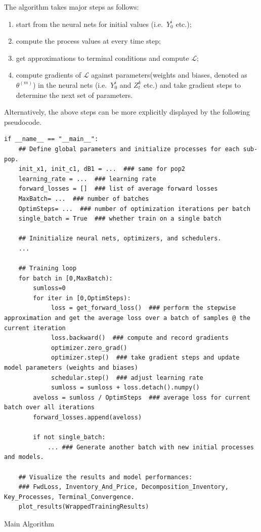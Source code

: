 \documentclass[a4paper,10pt]{article}
\newcommand{\1}{\mathbf{1}}
\begin{document}
The algorithm takes major steps as follows:

\begin{enumerate}
\tightlist
\item
  start from the neural nets for initial values (i.e.~\(Y_0^i\) etc.);
\item
  compute the process values at every time step;
\item
  get approximations to terminal conditions and compute \(\mathcal{L}\);
\item
  compute gradients of \(\mathcal{L}\) against parameters(weights and
  biases, denoted as \(\theta^{(m)}\)) in the neural nets
  (i.e.~\(Y_0^i\) and \(Z_t^k\) etc.) and take gradient steps to
  determine the next set of parameters.
\end{enumerate}

Alternatively, the above steps can be more explicitly displayed by the following pseudocode.

\begin{algorithm}[h]
\begin{verbatim}
if __name__ == "__main__":
    ## Define global parameters and initialize processes for each sub-pop. 
    init_x1, init_c1, dB1 = ...  ### same for pop2
    learning_rate = ...  ### learning rate
    forward_losses = []  ### list of average forward losses
    MaxBatch= ...  ### number of batches
    OptimSteps= ...  ### number of optimization iterations per batch
    single_batch = True  ### whether train on a single batch 

    ## Ininitialize neural nets, optimizers, and schedulers.
    ...

    ## Training loop
    for batch in [0,MaxBatch):
        sumloss=0
        for iter in [0,OptimSteps):
             loss = get_forward_loss()  ### perform the stepwise approximation and get the average loss over a batch of samples @ the current iteration
             loss.backward()  ### compute and record gradients
             optimizer.zero_grad()  
             optimizer.step()  ### take gradient steps and update model parameters (weights and biases)
             schedular.step()  ### adjust learning rate
             sumloss = sumloss + loss.detach().numpy() 
        aveloss = sumloss / OptimSteps  ### average loss for current batch over all iterations
        forward_losses.append(aveloss)
    
        if not single_batch:
            ... ### Generate another batch with new initial processes and models. 
    
    ## Visualize the results and model performances:
    ### FwdLoss, Inventory_And_Price, Decomposition_Inventory, Key_Processes, Terminal_Convergence.
    plot_results(WrappedTrainingResults)
\end{verbatim}
\caption{Main Algorithm}\label{alg:main-alg}
\end{algorithm}
\end{document}
